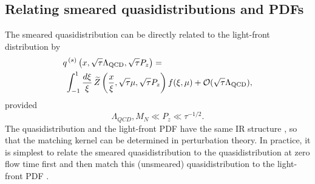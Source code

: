 \subsection{Relating smeared quasidistributions and PDFs}

The smeared quasidistribution can be directly related to the light-front distribution by \cite{Monahan:2016bvm}
\begin{align}
{} & q^{\,(s)}\left(x,\sqrt{\tau} \Lambda_{\mathrm{QCD}}, \sqrt{\tau}P_z\right) =  \nonumber \\
{} & \; \int_{-1}^{1}
\frac{d\xi}{\xi}\, \widetilde{Z}\left(\frac{x}{\xi},\sqrt{\tau}\mu,
\sqrt{\tau}P_z\right)
f(\xi,\mu) +
{\cal O}(\sqrt{\tau}\Lambda_{\mathrm{QCD}}),
\end{align}
provided
\begin{equation}\label{eq:scales_tau}
\Lambda_{QCD},M_N\ll P_z \ll \tau^{-1/2}.
\end{equation}
The quasidistribution and the light-front PDF have the same IR structure \cite{Ma:2014jla,Ma:2014jga,Carlson:2017gpk,Briceno:2017cpo}, so that the matching kernel can be determined in perturbation theory. In practice, it is simplest to relate the smeared quasidistribution to the quasidistribution at zero flow time first and then match this (unsmeared) quasidistribution to the light-front PDF \cite{Xiong:2013bka,Ji:2015jwa}.

